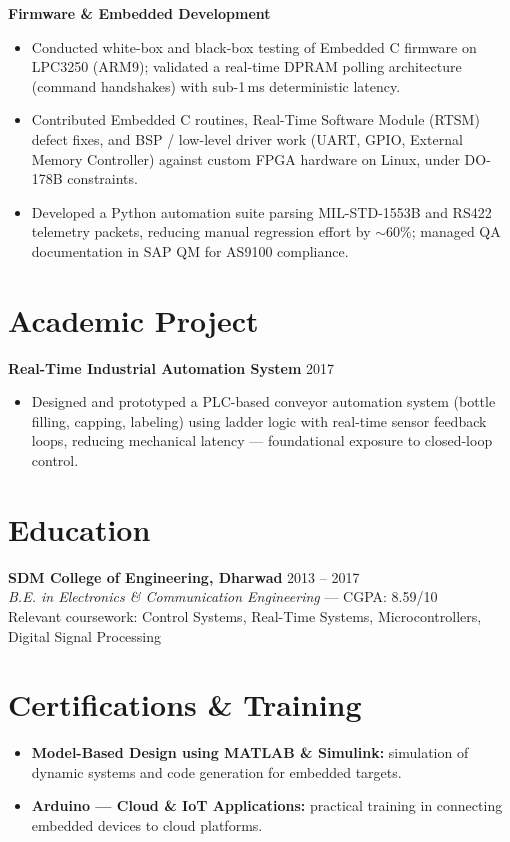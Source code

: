 \documentclass[11pt,a4paper]{article}
\begin{document}
\textbf{Firmware \& Embedded Development}
\begin{itemize}
    \item Conducted white-box and black-box testing of Embedded C firmware on LPC3250 (ARM9); validated a real-time DPRAM polling architecture (command handshakes) with sub-1\,ms deterministic latency.
    \item Contributed Embedded C routines, Real-Time Software Module (RTSM) defect fixes, and BSP / low-level driver work (UART, GPIO, External Memory Controller) against custom FPGA hardware on Linux, under DO-178B constraints.
    \item Developed a Python automation suite parsing MIL-STD-1553B and RS422 telemetry packets, reducing manual regression effort by $\sim$60\%; managed QA documentation in SAP QM for AS9100 compliance.
\end{itemize}

\section*{Academic Project}
\textbf{Real-Time Industrial Automation System} \hfill 2017
\begin{itemize}
    \item Designed and prototyped a PLC-based conveyor automation system (bottle filling, capping, labeling) using ladder logic with real-time sensor feedback loops, reducing mechanical latency --- foundational exposure to closed-loop control.
\end{itemize}

\section*{Education}
\textbf{SDM College of Engineering, Dharwad} \hfill 2013 -- 2017\\
\textit{B.E. in Electronics \& Communication Engineering} --- CGPA: 8.59/10\\
Relevant coursework: Control Systems, Real-Time Systems, Microcontrollers, Digital Signal Processing

\section*{Certifications \& Training}
\begin{itemize}
    \item \textbf{Model-Based Design using MATLAB \& Simulink:} simulation of dynamic systems and code generation for embedded targets.
    \item \textbf{Arduino --- Cloud \& IoT Applications:} practical training in connecting embedded devices to cloud platforms.
\end{itemize}
\end{document}

